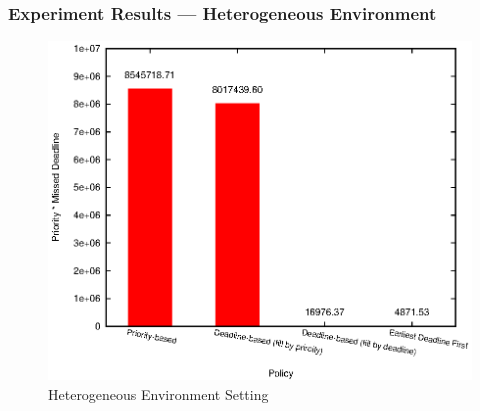 \begin{frame}
  \frametitle{Experiment Results --- Heterogeneous Environment}
  \begin{figure}[htbp]
    \centering
    \includegraphics[width=\textwidth,height=0.7\textheight,keepaspectratio]{figures/hetero.eps}
    \caption{Heterogeneous Environment Setting}
    \label{fig:hetero-exp}
  \end{figure}
\end{frame}

